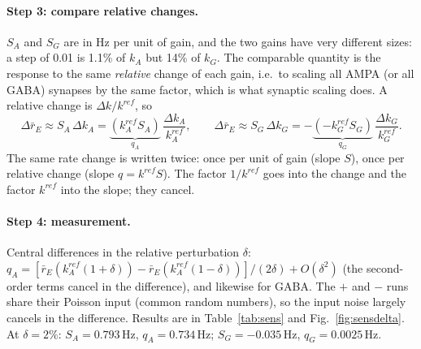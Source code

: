 \documentclass[11pt]{article}
\newcommand{\kA}{k_A}
\newcommand{\kG}{k_G}
\begin{document}
\paragraph{Step 3: compare relative changes.}
$S_A$ and $S_G$ are in Hz per unit of gain, and the two gains have very different sizes: a step of 0.01 is 1.1\% of
$\kA$ but 14\% of $\kG$. The comparable quantity is the response to the same \emph{relative} change of each gain, i.e.\
to scaling all AMPA (or all GABA) synapses by the same factor, which is what synaptic scaling does. A relative change is
$\Delta k/k^{ref}$, so
\[
\Delta\bar r_E \approx S_A\,\Delta\kA = \underbrace{(\kA^{ref} S_A)}_{q_A}\,\frac{\Delta\kA}{\kA^{ref}},\qquad
\Delta\bar r_E \approx S_G\,\Delta\kG = -\underbrace{(-\kG^{ref} S_G)}_{q_G}\,\frac{\Delta\kG}{\kG^{ref}} .
\]
The same rate change is written twice: once per unit of gain (slope $S$), once per relative change (slope $q = k^{ref}S$).
The factor $1/k^{ref}$ goes into the change and the factor $k^{ref}$ into the slope; they cancel.

\paragraph{Step 4: measurement.}
Central differences in the relative perturbation $\delta$:
$q_A = [\bar r_E(\kA^{ref}(1+\delta)) - \bar r_E(\kA^{ref}(1-\delta))]/(2\delta) + O(\delta^2)$ (the second-order terms cancel
in the difference), and likewise for GABA. The $+$ and $-$ runs share their Poisson input (common random numbers), so
the input noise largely cancels in the difference. Results are in Table~\ref{tab:sens} and Fig.~\ref{fig:sensdelta}. At
$\delta = 2\%$: $S_A = 0.793$\,Hz, $q_A = 0.734$\,Hz; $S_G = -0.035$\,Hz, $q_G = 0.0025$\,Hz.
\end{document}
